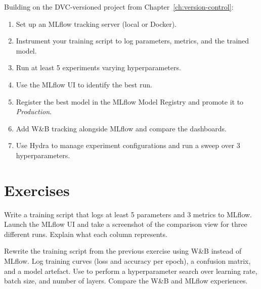 \begin{miniproject}[title=\textbf{Mini-project 4: Full experiment tracking}]
Building on the DVC-versioned project from Chapter~\ref{ch:version-control}:
\begin{enumerate}
  \item Set up an MLflow tracking server (local or Docker).
  \item Instrument your training script to log parameters, metrics, and
    the trained model.
  \item Run at least 5 experiments varying hyperparameters.
  \item Use the MLflow UI to identify the best run.
  \item Register the best model in the MLflow Model Registry and promote
    it to \emph{Production}.
  \item Add W\&B tracking alongside MLflow and compare the dashboards.
  \item Use Hydra to manage experiment configurations and run a sweep
    over 3 hyperparameters.
\end{enumerate}
\end{miniproject}

\section{Exercises}
\label{sec:exercises-ch4}

\begin{exercise}
Write a training script that logs at least 5 parameters and 3 metrics to
MLflow. Launch the MLflow UI and take a screenshot of the comparison view
for three different runs. Explain what each column represents.
\end{exercise}

\begin{exercise}
Rewrite the training script from the previous exercise using W\&B instead
of MLflow. Log training curves (loss and accuracy per epoch), a confusion
matrix, and a model artefact. Use  to perform a
hyperparameter search over learning rate, batch size, and number of layers.
Compare the W\&B and MLflow experiences.
\end{exercise}

